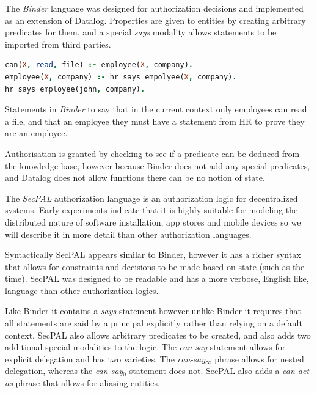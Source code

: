 \documentclass[a4paper]{article}
\begin{document}
The \emph{Binder} language\cite{DeTreville:2002ff} was designed for authorization
decisions\cite{Abadi:2003kt} and implemented as an extension of Datalog.
Properties are given to entities by creating arbitrary predicates for them, and
a special \emph{says} modality allows statements to be imported from third
parties.

\begin{marginfigure}\label{code:binder}
  \begin{lstlisting}[language=Prolog,morekeywords={*,says,:-},basicstyle=\scriptsize]
can(X, read, file) :- employee(X, company).
employee(X, company) :- hr says empolyee(X, company).
hr says employee(john, company).
  \end{lstlisting}
  \caption{Statements in \emph{Binder} to say that in the current context only
    employees can read a file, and that an employee they must have a statement
    from HR to prove they are an employee.}
\end{marginfigure}

Authorisation is granted by checking to see if a predicate can be deduced from
the knowledge base, however because Binder does not add any special predicates,
and Datalog does not allow functions there can be no notion of state.

The \emph{{SecPAL}} authorization language\cite{Becker:2006vh} is an authorization
logic for decentralized systems. Early experiments indicate that it is highly
suitable for modeling the distributed nature of software installation, app
stores and mobile devices so we will describe it in more detail than other
authorization languages.

Syntactically {SecPAL} appears similar to Binder, however it has a richer syntax
that allows for constraints and decisions to be made based on state (such as the
time). {SecPAL} was designed to be readable and has a more verbose, English like,
language than other authorization logics.

Like Binder it contains a \emph{says} statement however unlike Binder it
requires that all statements are said by a principal explicitly rather than
relying on a default context. {SecPAL} also allows arbitrary predicates to be
created, and also adds two additional special modalities to the logic. The
\emph{can-say} statement allows for explicit delegation and has two varieties.
The \emph{can-say$_\infty$} phrase allows for nested delegation, whereas the
\emph{can-say$_0$} statement does not. {SecPAL} also adds a \emph{can-act-as}
phrase that allows for aliasing entities.
\end{document}
